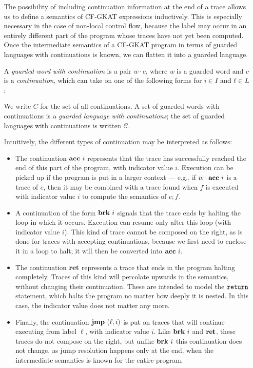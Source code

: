 The possibility of including continuation information at the end of a trace allows us to define a semantics of CF-GKAT expressions inductively.
This is especially necessary in the case of non-local control flow, because the label may occur in an entirely different part of the program whose traces have not yet been computed.
Once the intermediate semantics of a CF-GKAT program in terms of guarded languages with continuations is known, we can flatten it into a guarded language.

\begin{definition}
 A \emph{guarded word with continuation} is a pair $w ⋅ c$,
 where $w$ is a guarded word and $c$ is a \emph{continuation},
 which can take on one of the following forms for $i ∈ I$ and $ℓ ∈ L$:
 We write $C$ for the set of all continuations.
 A set of guarded words with continuations is a \emph{guarded language with continuations}; the set of guarded languages with continuations is written $𝒞$.
\end{definition}
Intuitively, the different types of continuation may be interpreted as follows:
\begin{itemize}
    \item
    The continuation ${\mathbf{acc} ~ i}$ represents that the trace has successfully reached the end of this part of the program, with indicator value \(i\).
    Execution can be picked up if the program is put in a larger context --- e.g., if $w \cdot {\mathbf{acc} ~ i}$ is a trace of $e$, then it may be combined with a trace found when $f$ is executed with indicator value $i$ to compute the semantics of $e; f$.
    \item
    A continuation of the form $\mathbf{brk} ~ i$ signals that the trace ends by halting the loop in which it occurs.
    Execution can resume only after this loop (with indicator value $i$).
    This kind of trace cannot be composed on the right, as is done for traces with accepting continuations, because we first need to enclose it in a loop to halt; it will then be converted into ${\mathbf{acc} ~ i}$.
    \item
    The continuation ${\mathbf{ret}}$ represents a trace that ends in the program halting completely.
    Traces of this kind will percolate upwards in the semantics, without changing their continuation.
    These are intended to model the $\texttt{return}$ statement, which halts the program no matter how deeply it is nested.
    In this case, the indicator value does not matter any more.
    \item
    Finally, the continuation ${\mathbf{jmp} ~ (\ell, i)}$ is put on traces that will continue executing from label $\ell$, with indicator value $i$.
    Like $\mathbf{brk} ~ i$ and ${\mathbf{ret}}$, these traces do not compose on the right, but unlike $\mathbf{brk} ~ i$ this continuation does not change, as jump resolution happens only at the end, when the intermediate semantics is known for the entire program.
\end{itemize}


